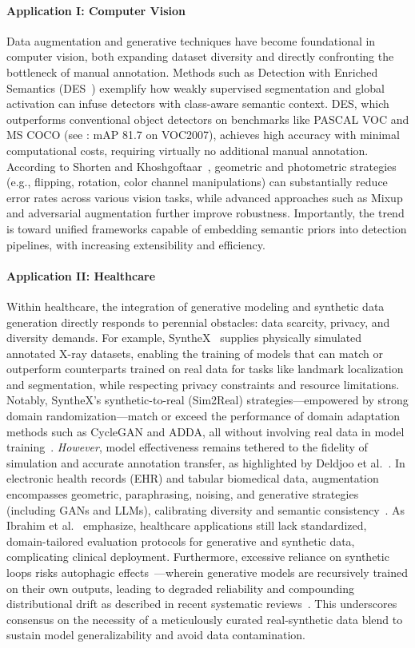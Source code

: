 \documentclass[sigconf]{acmart}
\begin{document}
\paragraph{Application I: Computer Vision}
Data augmentation and generative techniques have become foundational in computer vision, both expanding dataset diversity and directly confronting the bottleneck of manual annotation. Methods such as Detection with Enriched Semantics (DES~\cite{ref34}) exemplify how weakly supervised segmentation and global activation can infuse detectors with class-aware semantic context. DES, which outperforms conventional object detectors on benchmarks like PASCAL VOC and MS COCO (see \cite{ref34}: mAP 81.7 on VOC2007), achieves high accuracy with minimal computational costs, requiring virtually no additional manual annotation. According to Shorten and Khoshgoftaar~\cite{ref61}, geometric and photometric strategies (e.g., flipping, rotation, color channel manipulations) can substantially reduce error rates across various vision tasks, while advanced approaches such as Mixup and adversarial augmentation further improve robustness. Importantly, the trend is toward unified frameworks capable of embedding semantic priors into detection pipelines, with increasing extensibility and efficiency.

\paragraph{Application II: Healthcare}
Within healthcare, the integration of generative modeling and synthetic data generation directly responds to perennial obstacles: data scarcity, privacy, and diversity demands. For example, SyntheX~\cite{ref81} supplies physically simulated annotated X-ray datasets, enabling the training of models that can match or outperform counterparts trained on real data for tasks like landmark localization and segmentation, while respecting privacy constraints and resource limitations. Notably, SyntheX's synthetic-to-real (Sim2Real) strategies---empowered by strong domain randomization---match or exceed the performance of domain adaptation methods such as CycleGAN and ADDA, all without involving real data in model training~\cite{ref81,ref65}. \textit{However}, model effectiveness remains tethered to the fidelity of simulation and accurate annotation transfer, as highlighted by Deldjoo et al.~\cite{ref75}. In electronic health records (EHR) and tabular biomedical data, augmentation encompasses geometric, paraphrasing, noising, and generative strategies (including GANs and LLMs), calibrating diversity and semantic consistency~\cite{ref62,ref63,ref64}. As Ibrahim et al.~\cite{ref89} emphasize, healthcare applications still lack standardized, domain-tailored evaluation protocols for generative and synthetic data, complicating clinical deployment. Furthermore, excessive reliance on synthetic loops risks autophagic effects~\cite{ref82}---wherein generative models are recursively trained on their own outputs, leading to degraded reliability and compounding distributional drift as described in recent systematic reviews~\cite{ref89,ref90}. This underscores consensus on the necessity of a meticulously curated real-synthetic data blend to sustain model generalizability and avoid data contamination.
\end{document}
